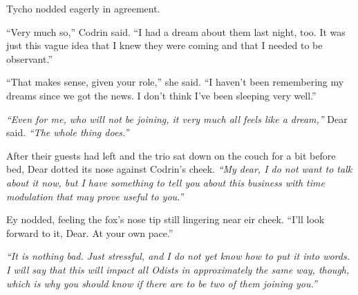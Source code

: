 Tycho nodded eagerly in agreement.

``Very much so,'' Codrin said. ``I had a dream about them last night, too. It was just this vague idea that I knew they were coming and that I needed to be observant.''

``That makes sense, given your role,'' she said. ``I haven't been remembering my dreams since we got the news. I don't think I've been sleeping very well.''

\emph{``Even for me, who will not be joining, it very much all feels like a dream,''} Dear said. \emph{``The whole thing does.''}

After their guests had left and the trio sat down on the couch for a bit before bed, Dear dotted its nose against Codrin's cheek. \emph{``My dear, I do not want to talk about it now, but I have something to tell you about this business with time modulation that may prove useful to you.''}

Ey nodded, feeling the fox's nose tip still lingering near eir cheek. ``I'll look forward to it, Dear. At your own pace.''

\emph{``It is nothing bad. Just stressful, and I do not yet know how to put it into words. I will say that this will impact all Odists in approximately the same way, though, which is why you should know if there are to be two of them joining you.''}
